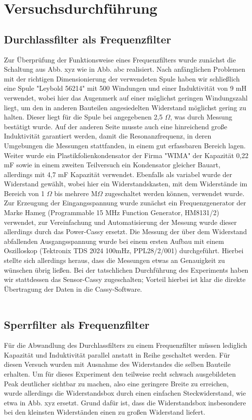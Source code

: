 \section{Versuchsdurchführung}

 \subsection{Durchlassfilter als Frequenzfilter}
Zur Überprüfung der Funktionsweise eines Frequenzfilters wurde zunächst die Schaltung aus
Abb. xyz wie in Abb. abc realisiert. Nach anfänglichen Problemen mit der richtigen Dimensionierung der verwendeten Spule haben wir schließlich eine Spule "Leybold 56214" mit 500 Windungen und einer Induktivität von 9 mH verwendet, wobei hier das Augenmerk auf einer möglichst geringen Windungszahl liegt, um den in anderen Bauteilen angesiedelten Widerstand möglichst gering zu halten. Dieser liegt für die Spule bei angegebenen 2,5 $ \Omega $, was durch Messung bestätigt wurde. Auf der anderen Seite musste auch eine hinreichend große Induktivität garantiert werden, damit die Resonanzfrequenz, in deren Umgebungen die Messungen stattfanden, in einem gut erfassbaren Bereich lagen. Weiter wurde ein Plastikfolienkondensator der Firma "WIMA" der Kapazität 0,22 mF sowie in einem zweiten Teilversuch ein Kondensator gleicher Bauart, allerdings mit 4,7 mF Kapazität verwendet. Ebenfalls als variabel wurde der Widerstand gewählt, wobei hier ein Widerstandskasten, mit dem Widerstände im Bereich von 1 $ \Omega $ bis mehrere M$ \Omega $ zugeschaltet werden können, verwendet wurde. \\
Zur Erzeugung der Eingangsspannung wurde zunächst ein Frequenzgenerator der Marke Hameg (Programmable 15 MHz Function Generator, HM8131/2) verwendet, zur Vereinfachung und Automatisierung der Messung wurde dieser allerdings durch das Power-Cassy ersetzt.
Die Messung der über dem Widerstand abfallenden Ausgangsspannung wurde bei einem ersten Aufbau mit einem Oszilloskop (Tektronix TDS 2024 100mHz, PPL28/2/001) durchgeführt. Hierbei stellte sich allerdings heraus, dass die Messungen etwas an Genauigkeit zu wünschen übrig ließen. Bei der tatschlichen Durchführung des Experiments haben wir stattdessen das Sensor-Cassy zugeschalten; Vorteil hierbei ist klar die direkte Übertragung der Daten in die Cassy-Software.\\
\\
\subsection{Sperrfilter als Frequenzfilter}
Für die Abwandlung des Durchlassfilters zu einem Frequenzfilter müssen lediglich Kapazität und Induktivität parallel anstatt in Reihe geschaltet werden. Für diesen Versuch wurden mit Ausnahme des Widerstandes die selben Bauteile erhalten. Um für dieses Experiment den teilweise recht schwach ausgebildeten Peak deutlicher sichtbar zu machen, also eine geringere Breite zu erreichen, wurde allerdings die Widerstandsbox durch einen einfachen Steckwiderstand, wie etwa in Abb. xyz ersetzt. Grund dafür ist, dass die Widerstandsbox insbesondere bei den kleinsten Widerständen einen zu großen Widerstand liefert.


